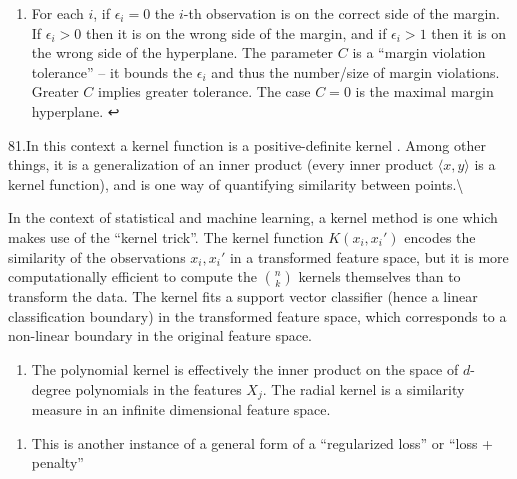 \documentclass[11pt]{article}
\providecommand{\tightlist}{%
      \setlength{\itemsep}{0pt}\setlength{\parskip}{0pt}}
\begin{document}
\hypertarget{foot80}{}
\begin{enumerate}
\def\labelenumi{\arabic{enumi}.}
\setcounter{enumi}{79}
\tightlist
\item
  For each \(i\), if \(\epsilon_i = 0\) the \(i\)-th observation is on
  the correct side of the margin. If \(\epsilon_i > 0\) then it is on
  the wrong side of the margin, and if \(\epsilon_i > 1\) then it is on
  the wrong side of the hyperplane. The parameter \(C\) is a ``margin
  violation tolerance'' -- it bounds the \(\epsilon_i\) and thus the
  number/size of margin violations. Greater \(C\) implies greater
  tolerance. The case \(C = 0\) is the maximal margin hyperplane. ↩
\end{enumerate}

\leavevmode\hypertarget{foot81}{}%
81.In this context a kernel function is a positive-definite kernel .
Among other things, it is a generalization of an inner product (every
inner product \(\langle x, y \rangle\) is a kernel function), and is one
way of quantifying similarity between points.\textbackslash{}

In the context of statistical and machine learning, a kernel method is
one which makes use of the ``kernel trick''. The kernel function
\(K(x_i, x_i')\) encodes the similarity of the observations
\(x_i, x_i'\) in a transformed feature space, but it is more
computationally efficient to compute the \(\binom{n}{k}\) kernels
themselves than to transform the data. The kernel fits a support vector
classifier (hence a linear classification boundary) in the transformed
feature space, which corresponds to a non-linear boundary in the
original feature space.

\hypertarget{foot82}{}
\begin{enumerate}
\def\labelenumi{\arabic{enumi}.}
\setcounter{enumi}{81}
\tightlist
\item
  The polynomial kernel is effectively the inner product on the space of
  \(d\)-degree polynomials in the features \(X_j\). The radial kernel is
  a similarity measure in an infinite dimensional feature space.
\end{enumerate}

\hypertarget{foot83}{}
\begin{enumerate}
\def\labelenumi{\arabic{enumi}.}
\setcounter{enumi}{82}
\tightlist
\item
  This is another instance of a general form of a ``regularized loss''
  or ``loss + penalty''
\end{enumerate}
\end{document}
